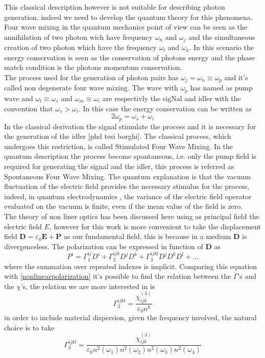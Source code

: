 \documentclass[12pt]{book}
\begin{document}
This classical description however is not suitable for describing photon generation, indeed we need to develop the quantum theory for this phenomena. Four wave mixing in the quantum mechanics point of view can be seen as the annihilation of two photon wich have frequency $\omega_n$ and $\omega_j$ and the simultaneous creation of two photon which have the frequency $\omega_l$ and $\omega_k$. In this scenario the energy conservation is seen as the conservation of photons energy and the phase match condition is the photons momentum conservation.\\
The process used for the generation of photon pairs has $\omega_j = \omega_n \equiv \omega_p$ and it's called non degenerate four wave mixing. The wave with $\omega_p$ has named as pump wave and $\omega_l\equiv \omega_s$ and $\omega_m \equiv \omega_i$ are respectivly the sigNal and idler with the convention that $\omega_s > \omega_i$. In this case the energy conservation can be written as
\begin{equation}\label{conservationenergy}2\omega_p = \omega_s + \omega_i\end{equation}
In the classical derivation the signal stimulate the process and it is necessary for the generation of the idler [phd tesi borghi]. The classical process, which undergoes this restriction, is called Stimulated Four Wave Mixing. In the quantum description the process become spontaneous, i.e. only the pump field is required for generating the signal and the idler, this process is referred as Spontaneous Four Wave Mixing. The quantum explanation is that the vacuum fluctuation of the electric field provides the necessary stimulus for the process, indeed, in quantum electrodynamics \cite{book:cohen}, the variance of the electric field operator evaluated on the vacuum is finite, even if the mean value of the field is zero.\\
The theory of non liner optics has been discussed here using as principal field the electric field $E$, however for this work is more convenient to take the displacement field $\mathbf{D} = \varepsilon_0\mathbf{E} +\mathbf{P} $ as our fundamental field, this is because in a medium $\mathbf{D}$ is divergenceless. The polarization can be expressed in function of $\mathbf{D}$ as
\begin{equation}P^i = \Gamma^{ij}_1D^i +\Gamma_2^{ijk}D^jD^k + \Gamma_3^{ijkl}D^jD^kD^l + \dots\end{equation}
where the summation over repeated indexes is implicit. Comparing this equation with \eqref{nonlinearpolarization} it's possible to find the relation between the $\Gamma$'s and the $\chi$'s, the relation we are more interested in is
\begin{equation}\Gamma_3^{ijkl} = \frac{\chi_{ijk}^{(3)}}{\varepsilon_0 n^8}\end{equation}
in order to include material dispersion, given the frequency involved, the natural choice is to take
\begin{equation}\Gamma_3^{ijkl} = \frac{\chi_{ijk}^{(3)}}{\varepsilon_0 n^2(\omega_1)n^2(\omega_2)n^2(\omega_3)n^2(\omega_4)}\end{equation}
\end{document}
